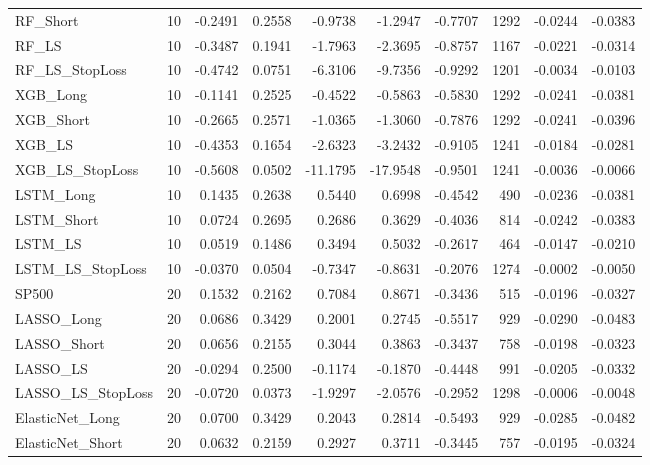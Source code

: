 \begin{tabular}{llrrrrrrrr}
\cline{1-10}
RF\_Short & 10 & -0.2491 & 0.2558 & -0.9738 & -1.2947 & -0.7707 & 1292 & -0.0244 & -0.0383 \\
\cline{1-10}
RF\_LS & 10 & -0.3487 & 0.1941 & -1.7963 & -2.3695 & -0.8757 & 1167 & -0.0221 & -0.0314 \\
\cline{1-10}
RF\_LS\_StopLoss & 10 & -0.4742 & 0.0751 & -6.3106 & -9.7356 & -0.9292 & 1201 & -0.0034 & -0.0103 \\
\cline{1-10}
XGB\_Long & 10 & -0.1141 & 0.2525 & -0.4522 & -0.5863 & -0.5830 & 1292 & -0.0241 & -0.0381 \\
\cline{1-10}
XGB\_Short & 10 & -0.2665 & 0.2571 & -1.0365 & -1.3060 & -0.7876 & 1292 & -0.0241 & -0.0396 \\
\cline{1-10}
XGB\_LS & 10 & -0.4353 & 0.1654 & -2.6323 & -3.2432 & -0.9105 & 1241 & -0.0184 & -0.0281 \\
\cline{1-10}
XGB\_LS\_StopLoss & 10 & -0.5608 & 0.0502 & -11.1795 & -17.9548 & -0.9501 & 1241 & -0.0036 & -0.0066 \\
\cline{1-10}
LSTM\_Long & 10 & 0.1435 & 0.2638 & 0.5440 & 0.6998 & -0.4542 & 490 & -0.0236 & -0.0381 \\
\cline{1-10}
LSTM\_Short & 10 & 0.0724 & 0.2695 & 0.2686 & 0.3629 & -0.4036 & 814 & -0.0242 & -0.0383 \\
\cline{1-10}
LSTM\_LS & 10 & 0.0519 & 0.1486 & 0.3494 & 0.5032 & -0.2617 & 464 & -0.0147 & -0.0210 \\
\cline{1-10}
LSTM\_LS\_StopLoss & 10 & -0.0370 & 0.0504 & -0.7347 & -0.8631 & -0.2076 & 1274 & -0.0002 & -0.0050 \\
\cline{1-10}
SP500 & 20 & 0.1532 & 0.2162 & 0.7084 & 0.8671 & -0.3436 & 515 & -0.0196 & -0.0327 \\
\cline{1-10}
LASSO\_Long & 20 & 0.0686 & 0.3429 & 0.2001 & 0.2745 & -0.5517 & 929 & -0.0290 & -0.0483 \\
\cline{1-10}
LASSO\_Short & 20 & 0.0656 & 0.2155 & 0.3044 & 0.3863 & -0.3437 & 758 & -0.0198 & -0.0323 \\
\cline{1-10}
LASSO\_LS & 20 & -0.0294 & 0.2500 & -0.1174 & -0.1870 & -0.4448 & 991 & -0.0205 & -0.0332 \\
\cline{1-10}
LASSO\_LS\_StopLoss & 20 & -0.0720 & 0.0373 & -1.9297 & -2.0576 & -0.2952 & 1298 & -0.0006 & -0.0048 \\
\cline{1-10}
ElasticNet\_Long & 20 & 0.0700 & 0.3429 & 0.2043 & 0.2814 & -0.5493 & 929 & -0.0285 & -0.0482 \\
\cline{1-10}
ElasticNet\_Short & 20 & 0.0632 & 0.2159 & 0.2927 & 0.3711 & -0.3445 & 757 & -0.0195 & -0.0324 \\

\end{tabular}

